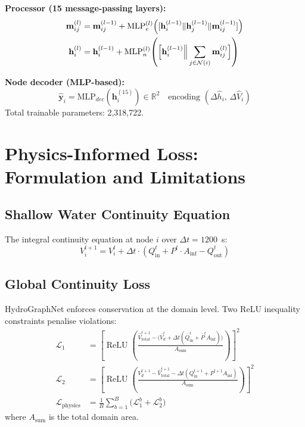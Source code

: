 \documentclass[conference]{IEEEtran}
\DeclareMathOperator{\ReLU}{ReLU}
\begin{document}
\noindent\textbf{Processor (15 message-passing layers):}
\begin{align}
  \mathbf{m}_{ij}^{(l)} &= \mathbf{m}_{ij}^{(l-1)}
    + \text{MLP}_{e}^{(l)}\!\left([\mathbf{h}_i^{(l-1)}\|
      \mathbf{h}_j^{(l-1)}\|\mathbf{m}_{ij}^{(l-1)}]\right) \\
  \mathbf{h}_i^{(l)} &= \mathbf{h}_i^{(l-1)}
    + \text{MLP}_{n}^{(l)}\!\left(
      \Bigl[\mathbf{h}_i^{(l-1)}\Big\|
      \sum_{j\in\mathcal{N}(i)}\mathbf{m}_{ij}^{(l)}\Bigr]\right)
\end{align}

\noindent\textbf{Node decoder (MLP-based):}
\begin{equation}
  \hat{\mathbf{y}}_i = \text{MLP}_{dec}\!\left(\mathbf{h}_i^{(15)}\right)
  \in \mathbb{R}^2
  \quad\text{encoding }(\Delta\hat{h}_i,\,\Delta\hat{V}_i)
\end{equation}
Total trainable parameters: 2,318,722.

\section{Physics-Informed Loss: Formulation and Limitations}
\label{sec:loss}

\subsection{Shallow Water Continuity Equation}
The integral continuity equation at node $i$ over $\Delta t = 1200$~s:
\begin{equation}
  V_i^{t+1} = V_i^t + \Delta t\cdot\left(Q_{\text{in}}^t
    + P^t\cdot A_{\text{inf}} - Q_{\text{out}}^t\right)
\end{equation}

\subsection{Global Continuity Loss}
HydroGraphNet enforces conservation at the domain level. Two ReLU
inequality constraints penalise violations:
\begin{align}
  \mathcal{L}_1 &= \left[\ReLU\!\left(
    \frac{\hat{V}_{\text{total}}^{t+1}
      - \bigl(\bar{V}^t_{d} + \Delta t({\bar{Q}}_{\text{in}}^t
        + \bar{P}^t A_{\text{inf}})\bigr)}
      {A_{\text{sum}}}\right)\right]^2 \\
  \mathcal{L}_2 &= \left[\ReLU\!\left(
    \frac{V^{t+1}_{d} - \hat{V}_{\text{total}}^{t+1}
      - \Delta t(Q_{\text{in}}^{t+1}+P^{t+1}A_{\text{inf}})}
      {A_{\text{sum}}}\right)\right]^2 \\
  \mathcal{L}_{\text{physics}} &=
    \frac{1}{B}\sum_{b=1}^{B}\bigl(\mathcal{L}_1^b+\mathcal{L}_2^b\bigr)
\end{align}
where $A_{\text{sum}}$ is the total domain area.
\end{document}
